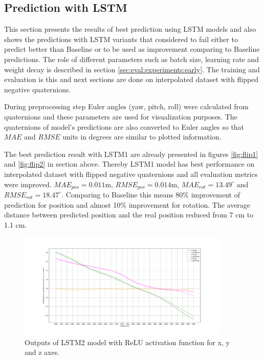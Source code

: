 \subsection{Prediction with LSTM}
\label{sec:eval:experiments:lstm}
This section presents the results of best prediction using LSTM models and also shows the predictions with LSTM variants that considered to fail either to predict better than Baseline or to be used as improvement comparing to Baseline predictions. The role of different parameters such as batch size, learning rate and weight decay is described in section \ref{sec:eval:experiments:early}. The training and evaluation is this and next sections are done on interpolated dataset with flipped negative quaternions. 

During preprocessing step Euler angles (yaw, pitch, roll) were calculated from quaternions and these parameters are used for visualization purposes. The quaternions of model's predictions are also converted to Euler angles so that $MAE$ and $RMSE$ units in degrees are similar to plotted information. 

The best prediction result with LSTM1 are already presented in figures \ref{fig:flip1} and \ref{fig:flip2} in section above. Thereby LSTM1 model has best performance on interpolated dataset with flipped negative quaternions and all evaluation metrics were improved. $MAE_{pos} = 0.011$m, $RMSE_{pos} = 0.014$m, $MAE_{rot} = 13.49^{\circ}$ and $RMSE_{rot}  =18.47^{\circ}$. Comparing to Baseline this means 80\% improvement of prediction for position and almost 10\% improvement for rotation. The average distance between predicted position and the real position reduced from 7 cm to 1.1 cm.
\begin{figure}[t]
	\begin{center}
		\includegraphics[width=0.9\textwidth, keepaspectratio]{gfx/lstm2_relu-xyz_position.pdf}
		\caption{\label{fig:lstm2-1} Outputs of LSTM2 model with ReLU activation function for x, y and z axes.}
	\end{center}
\end{figure}

